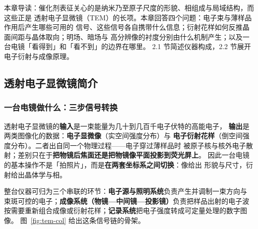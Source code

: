 
%
{本章导读：催化剂表征关心的是纳米乃至原子尺度的形貌、相组成与局域结构，而这些正是
透射电子显微镜（TEM）的长项。本章回答四个问题：电子束与薄样品作用后产生哪些可用的
信号、这些信号各自携带什么信息；衍射花样如何反推晶面间距与晶体取向；明场、暗场与
高分辨像的衬度分别由什么机制产生；以及一台电镜「看得到」和「看不到」的边界在哪里。
2.1 节简述仪器构成，2.2 节展开电子衍射与成像原理。}

\label{ch:02}

\subsection{透射电子显微镜简介}

\subsubsection{一台电镜做什么：三步信号转换}

\begin{probout}
透射电子显微镜的\textbf{输入}是一束能量为几十到几百千电子伏特的高能电子，
\textbf{输出}是两类图像化的数据：\textbf{电子显微像}（实空间强度分布）与
\textbf{电子衍射花样}（倒空间强度分布）。二者出自同一个物理过程——电子穿过薄样品时
被原子核与核外电子散射；差别只在于\textbf{把物镜后焦面还是把物镜像平面投影到荧光屏上}。
因此一台电镜的基本操作不是「拍照片」，而是\textbf{在两套坐标系之间切换}：像给出
形貌与尺寸，衍射给出晶体学与相。
\end{probout}

整台仪器可归为三个串联的环节：\textbf{电子源与照明系统}负责产生并调制一束方向与
束斑可控的电子；\textbf{成像系统（物镜—中间镜—投影镜）}负责把样品出射的电子波
按需要重新组合成像或衍射花样；\textbf{记录系统}把电子强度转成可定量处理的数字图像。
图~\ref{fig:tem-col} 给出这条信号链的骨架。

